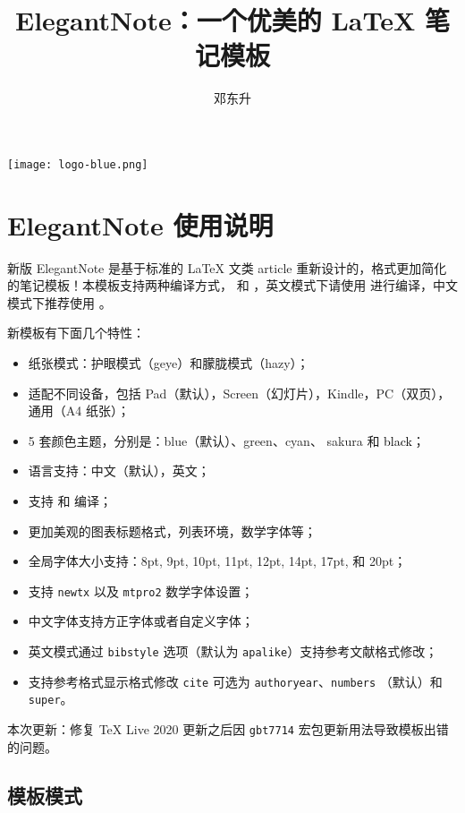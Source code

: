 \documentclass[cn,hazy,blue,14pt,screen]{elegantnote}
\title{ElegantNote：一个优美的 \LaTeX{} 笔记模板}
\author{邓东升}
\institute{Elegant\LaTeX{} Program}
\date{\zhtoday}
\begin{document}
\maketitle

\centerline{
  \texttt{[image: logo-blue.png]}
}


\section{ElegantNote 使用说明}

新版 ElegantNote 是基于标准的 \LaTeX{} 文类 article 重新设计的，格式更加简化的笔记模板！本模板支持两种编译方式， 和 ，英文模式下请使用  进行编译，中文模式下推荐使用 。

新模板有下面几个特性：

\begin{itemize}
  \item 纸张模式：护眼模式（geye）和朦胧模式（hazy）；
  \item 适配不同设备，包括 Pad（默认），Screen（幻灯片），Kindle，PC（双页），通用（A4 纸张）；
  \item 5 套颜色主题，分别是：\textcolor{eblue}{blue}（默认）、\textcolor{egreen}{green}、\textcolor{ecyan}{cyan}、 \textcolor{sakura}{sakura} 和 \textcolor{black}{black}；
  \item 语言支持：中文（默认），英文；
  \item 支持  和  编译；
  \item 更加美观的图表标题格式，列表环境，数学字体等；
  \item 全局字体大小支持：8pt, 9pt, 10pt, 11pt, 12pt, 14pt, 17pt, 和 20pt；
  \item 支持 \lstinline{newtx} 以及 \lstinline{mtpro2} 数学字体设置； 
  \item 中文字体支持方正字体或者自定义字体；
  \item 英文模式通过 \lstinline{bibstyle} 选项（默认为 \lstinline{apalike}）支持参考文献格式修改；
  \item 支持参考格式显示格式修改 \lstinline{cite} 可选为 \lstinline{authoryear}、\lstinline{numbers} （默认）和 \lstinline{super}。
\end{itemize}

本次更新：修复 \TeX{} Live 2020 更新之后因 \lstinline{gbt7714} 宏包更新用法导致模板出错的问题。

\subsection{模板模式}
\end{document}

